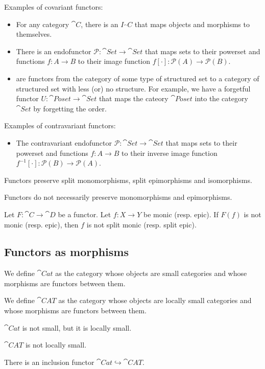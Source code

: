 \begin{example}
Examples of covariant functors:
\begin{itemize}
\item For any category $\cat{C}$, there is an  $I_\cat{C}$ that maps objects and morphisms to themselves.
\item There is an endofunctor $\mathcal{P}:\cat{Set} \to \cat{Set}$ that maps sets to their powerset and functions $f:A\to B$ to their image function $f[\cdot]:\mathcal{P}(A)\to \mathcal{P}(B)$.
\item {} are functors from the category of some type of structured set to a category of structured set with less (or) no structure. For example, we have a forgetful functor $U: \cat{Poset} \to \cat{Set}$ that maps the cateory $\cat{Poset}$ into the category $\cat{Set}$ by forgetting the order. 
\end{itemize}
Examples of contravariant functors:
\begin{itemize}
\item The contravariant endofunctor $\mathcal{P}:\cat{Set} \to \cat{Set}$ that maps sets to their powerset and functions $f:A\to B$ to their inverse image function $f^{-1}[\cdot]:\mathcal{P}(B)\to \mathcal{P}(A)$.
\end{itemize}
\end{example}

\begin{lemma} \label{lemma:functorMorphismPreservation}
Functors preserve split monomorphisms, split epimorphisms and isomorphisms.
\end{lemma}
Functors do not necessarily preserve monomorphisms and epimorphisms.
\begin{corollary}
Let $F:\cat{C}\to \cat{D}$ be a functor. Let $f:X \to Y$ be monic (resp. epic). If $F(f)$ is not monic (resp. epic), then $f$ is not split monic (resp. split epic).
\end{corollary}

\subsection{Functors as morphisms}
\begin{definition}
We define $\cat{Cat}$ as the category whose objects are small categories and whose morphisms are functors between them.

We define $\cat{CAT}$ as the category whose objects are locally small categories and whose morphisms are functors between them.
\end{definition}
\begin{lemma}
$\cat{Cat}$ is not small, but it is locally small.

$\cat{CAT}$ is not locally small.
\end{lemma}
There is an inclusion functor $\cat{Cat} \hookrightarrow \cat{CAT}$.


